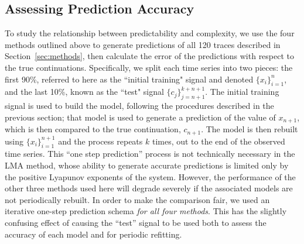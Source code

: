 \subsection{Assessing Prediction Accuracy}
\label{sec:accuracy}

To study the relationship between predictability and complexity, we
use the four methods outlined above to generate predictions of all 120
traces described in Section~\ref{sec:methods}, then calculate the
error of the predictions with respect to the true continuations.
Specifically, we split each time series into two pieces: the first
90\%, referred to here as the ``initial training" signal and denoted
$\{x_i\}_{i=1}^{n}$, and the last 10\%, known as the ``test" signal
$\{c_j\}_{j=n+1}^{k+n+1}$.  The initial training signal is used to
build the model, following the procedures described in the previous
section; that model is used to generate a prediction of the value of
$x_{n+1}$, which is then compared to the true continuation, $c_{n+1}$.
The model is then rebuilt using $\{x_i\}_{i=1}^{n+1}$ and the process
repeats $k$ times, out to the end of the observed time series.  This
``one step prediction'' process is not technically necessary in the
LMA method, whose ability to generate accurate predictions is limited
only by the positive Lyapunov exponents of the system.  However, the
performance of the other three methods used here will degrade severely
if the associated models are not periodically rebuilt.  In order to
make the comparison fair, we used an iterative one-step prediction
schema \emph{for all four methods}.  This has the slightly confusing
effect of causing the ``test'' signal to be used both to assess the
accuracy of each model and for periodic refitting.

